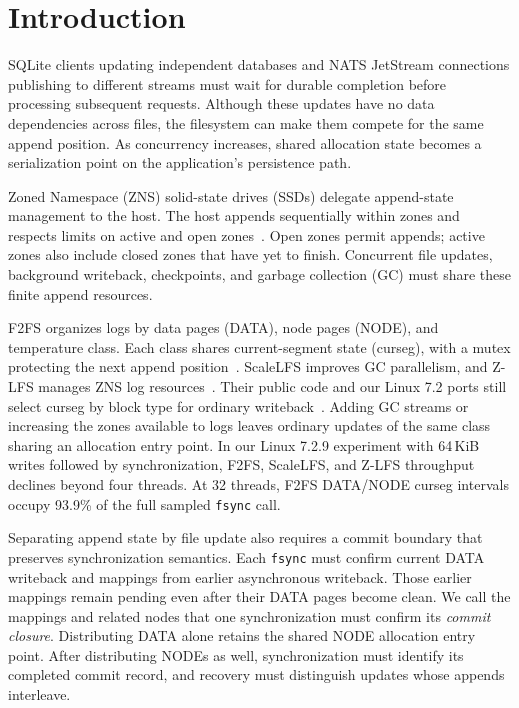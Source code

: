 \section{Introduction}\label{sec:introduction}
SQLite clients updating independent databases and NATS JetStream connections publishing to different streams must wait for durable completion before processing subsequent requests.
Although these updates have no data dependencies across files, the filesystem can make them compete for the same append position.
As concurrency increases, shared allocation state becomes a serialization point on the application's persistence path.

Zoned Namespace (ZNS) solid-state drives (SSDs) delegate append-state management to the host.
The host appends sequentially within zones and respects limits on active and open zones~\cite{r3,r5,r9}.
Open zones permit appends; active zones also include closed zones that have yet to finish.
Concurrent file updates, background writeback, checkpoints, and garbage collection (GC) must share these finite append resources.

F2FS organizes logs by data pages (DATA), node pages (NODE), and temperature class.
Each class shares current-segment state (curseg), with a mutex protecting the next append position~\cite{r1}.
ScaleLFS improves GC parallelism, and Z-LFS manages ZNS log resources~\cite{r5,r8}.
Their public code and our Linux 7.2 ports still select curseg by block type for ordinary writeback~\cite{r13,r14}.
Adding GC streams or increasing the zones available to logs leaves ordinary updates of the same class sharing an allocation entry point.
In our Linux 7.2.9 experiment with 64\,KiB writes followed by synchronization, F2FS, ScaleLFS, and Z-LFS throughput declines beyond four threads.
At 32 threads, F2FS DATA/NODE curseg intervals occupy 93.9\% of the full sampled \texttt{fsync} call.

Separating append state by file update also requires a commit boundary that preserves synchronization semantics.
Each \texttt{fsync} must confirm current DATA writeback and mappings from earlier asynchronous writeback.
Those earlier mappings remain pending even after their DATA pages become clean.
We call the mappings and related nodes that one synchronization must confirm its \emph{commit closure}.
Distributing DATA alone retains the shared NODE allocation entry point.
After distributing NODEs as well, synchronization must identify its completed commit record, and recovery must distinguish updates whose appends interleave.

